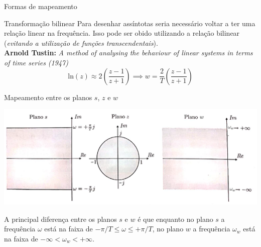 \begin{frame}{Formas de mapeamento}
    \begin{block}{Transformação bilinear}
    Para desenhar assíntotas seria necessário voltar a ter uma relação linear na frequência. Isso pode ser obido utilizando a relação bilinear (\textit{evitando a utilização de funções transcendentais}). \\
    \vspace{0.3 cm}
    \textbf{Arnold Tustin:} \textit{A method of analysing the behaviour of linear systems in terms of time series (1947)}\\
    \vspace{0.3 cm}
    \begin{equation*}
        \text{ln}(z) \approx 2 \left(\dfrac{z - 1}{z + 1}\right) \implies w = \dfrac{2}{T}\left(\dfrac{z - 1}{z + 1}\right)
    \end{equation*}
    \end{block}
\end{frame}

\begin{frame}{Mapeamento entre os planos $s$, $z$ e $w$}
\centerline{\includegraphics[width=1\linewidth]{Figuras/Ch13/fig5.png}}
	\begin{block}{}
	A principal diferença entre os planos $s$ e $w$ é que enquanto no plano $s$ a frequência $\omega$ está na faixa de $ -\pi/T \leq \omega \leq +\pi/T$, no plano $w$ a frequência $\omega_w $ está na faixa de $ -\infty < \omega_w < +\infty $.
	\end{block}
\end{frame}

